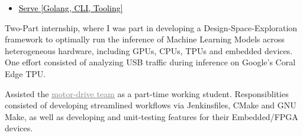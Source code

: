 \documentclass[10pt,a4paper,ragged2e,withhyper]{altacv}
\begin{document}
\begin{paracol}{2}
\begin{itemize}
 \item \href{https://github.com/duclos-cavalcanti/serve}
     {\underline{{\textcolor{black}{Serve}}} \hfill \textcolor{black}{[Golang, CLI, Tooling]}}
\end{itemize}



%
%


\medskip

\nocite{*}

\switchcolumn
{}

Two-Part internship, where I was part in developing a Design‑Space‑Exploration framework to optimally 
run the inference of Machine Learning Models across heterogeneous hardware,
including GPUs, CPUs, TPUs and embedded devices. 
One effort consisted of analyzing USB traffic during inference on Google's Coral Edge TPU.

\divider

Assisted the \href{https://molabo.com/unternehmen/}{{\textcolor{gray}{\underline{motor-drive team}}}}
as a part-time working student. Responsiblities consisted of
developing streamlined workflows via Jenkinsfiles, CMake and GNU Make, as well as 
developing and unit-testing features for their Embedded/FPGA devices.


\end{paracol}
\end{document}
